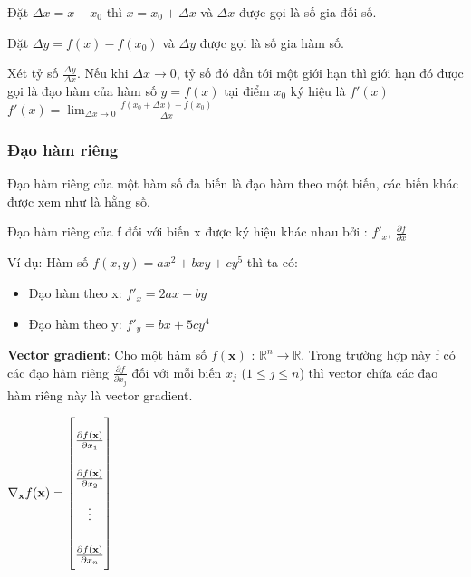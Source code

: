 Đặt $   \Delta x=x-x_0$ thì $  x = x_0+\Delta x$ và $\Delta x$ được gọi là số gia đối số. \par

Đặt $  \Delta y = f(x)-f(x_0)$ và $\Delta y$ được gọi là số gia hàm số. \par

Xét tỷ số ${  {\frac {\Delta y}{\Delta x}}}$. Nếu khi $  \Delta x\rightarrow0$, tỷ số đó dần tới một giới hạn thì giới hạn đó được gọi là đạo hàm của hàm số $  y=f(x)$ tại điểm $  x_0$ ký hiệu là ${  f'(x)}$\\

${  f'(x)=\lim _{\Delta x\rightarrow 0}{\frac {f(x_{0}+\Delta x)-f(x_{0})}{\Delta x}}}  $
\subsubsection{Đạo hàm riêng}
Đạo hàm riêng của một hàm số đa biến là đạo hàm theo một biến, các biến khác được xem như là hằng số. \par
Đạo hàm riêng của f đối với biến x được ký hiệu khác nhau bởi : ${  f'_x }$,  ${  \frac{\partial f}{\partial x} }.$\par
Ví dụ: Hàm số $f(x,y) = ax^2 + bxy + cy^5$ thì ta có:
\begin{itemize}
\setlength{\itemindent}{10mm}
	\item Đạo hàm theo x: ${  f'_x = 2ax +by}$
	\item Đạo hàm theo y: ${  f'_y = bx +5cy^4}$	
\end{itemize}

\textbf{Vector gradient}:
Cho một hàm số $f(\textbf{x})$ : $\mathbb{R}^n \rightarrow \mathbb{R}$. Trong trường hợp này f có các đạo hàm riêng $   \frac{\partial f}{\partial x_j}$ đối với mỗi biến $ x_j$ ($1\leq j \leq n$) thì vector chứa các đạo hàm riêng này là vector gradient.\par
\begin{center}

$ \nabla_\textbf{x}f(\textbf{x}) =
\renewcommand{\arraystretch}{2.5} 
\begin{bmatrix}

\frac{\partial f(\textbf{x})}{\partial x_1}\\ \frac{\partial f(\textbf{x})}{\partial x_2} \\ \vdots \\ \frac{\partial f(\textbf{x})}{\partial x_n}
\end{bmatrix}  $
\end{center}

